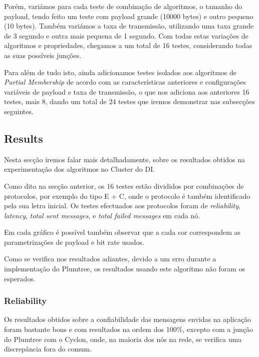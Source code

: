 Porém, variámos para cada teste de combinação de algoritmos, o tamanho do payload, tendo feito um teste com payload grande (10000 bytes) e outro pequeno (10 bytes). Também variámos a taxa de transmissão, utilizando uma taxa grande de 3 segundo e outra mais pequena de 1 segundo. Com todas estas variações de algoritmos e propriedades, chegamos a um total de 16 testes, considerando todas as suas possíveis junções.

Para além de tudo isto, ainda adicionamos testes isolados aos algoritmos de \textit{Partial Membership} de acordo com as características anteriores e configurações variáveis de payload e taxa de transmissão, o que nos adiciona aos anteriores 16 testes, mais 8, dando um total de 24 testes que iremos demonstrar nas subsecções seguintes.

\subsection{Results}


Nesta secção iremos falar mais detalhadamente, sobre os resultados obtidos na experimentação dos algoritmos no Cluster do DI.

Como dito na secção anterior, os 16 testes estão divididos por combinações de protocolos, por exemplo do tipo E + C, onde o protocolo é também identificado pela sua letra inicial. Os testes efectuados aos protocolos foram de \textit{reliability}, \textit{latency}, \textit{total sent messages}, e \textit{total failed messages} em cada nó. 

Em cada gráfico é possível também observar que a cada cor correspondem as parametrizações de payload e bit rate usados.

Como se verifica nos resultados adiantes, devido a um erro durante a implementação do Plumtree, os resultados usando este algoritmo não foram os esperados.


\subsubsection{Reliability}

Os resultados obtidos sobre a confiabilidade das mensagens envidas na aplicação foram bastante bons e com resultados na ordem dos 100\%, excepto com a junção do Plumtree com o Cyclon, onde, na maioria dos nós na rede, se verifica uma discrepância fora do comum.

